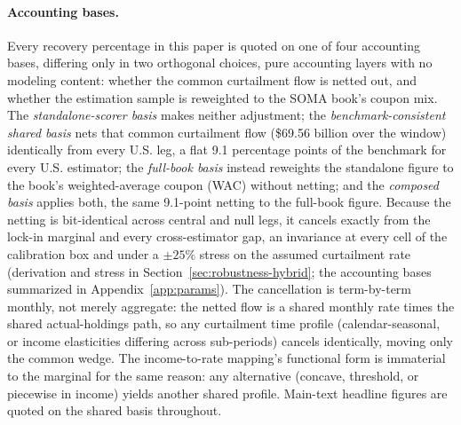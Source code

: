 \documentclass[12pt]{article}
\begin{document}
\paragraph{Accounting bases.} Every recovery percentage in this paper is quoted on one of four accounting bases, differing only in two orthogonal choices, pure accounting layers with no modeling content: whether the common curtailment flow is netted out, and whether the estimation sample is reweighted to the SOMA book's coupon mix. The \emph{standalone-scorer basis} makes neither adjustment; the \emph{benchmark-consistent shared basis} nets that common curtailment flow (\$69.56 billion over the window) identically from every U.S. leg, a flat 9.1 percentage points of the benchmark for every U.S. estimator; the \emph{full-book basis} instead reweights the standalone figure to the book's weighted-average coupon (WAC) without netting; and the \emph{composed basis} applies both, the same 9.1-point netting to the full-book figure. Because the netting is bit-identical across central and null legs, it cancels exactly from the lock-in marginal and every cross-estimator gap, an invariance at every cell of the calibration box and under a $\pm 25\%$ stress on the assumed curtailment rate (derivation and stress in Section~\ref{sec:robustness-hybrid}; the accounting bases summarized in Appendix~\ref{app:params}). The cancellation is term-by-term monthly, not merely aggregate: the netted flow is a shared monthly rate times the shared actual-holdings path, so any curtailment time profile (calendar-seasonal, or income elasticities differing across sub-periods) cancels identically, moving only the common wedge. The income-to-rate mapping's functional form is immaterial to the marginal for the same reason: any alternative (concave, threshold, or piecewise in income) yields another shared profile. Main-text headline figures are quoted on the shared basis throughout.
\end{document}
